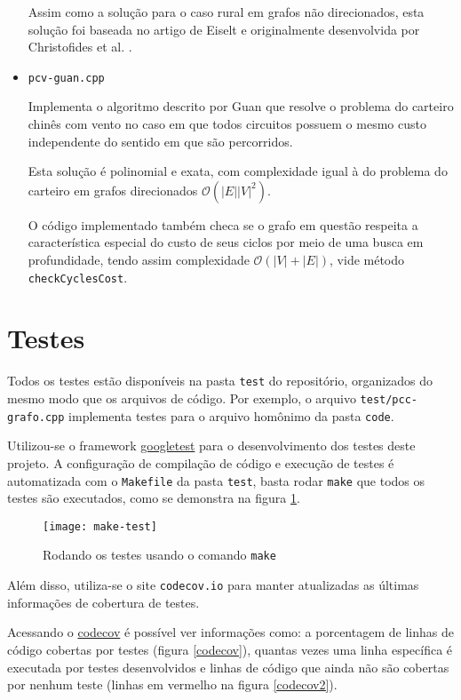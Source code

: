 \begin{itemize}
        Assim como a solução para o caso rural em grafos não direcionados, esta solução foi baseada no artigo de Eiselt \cite{michel} e originalmente desenvolvida por Christofides et al. \cite{christofides-86}.
            
    \item \texttt{pcv-guan.cpp}

        Implementa o algoritmo descrito por Guan \cite{guan-windy} que resolve o problema do carteiro chinês com vento no caso em que todos circuitos possuem o mesmo custo independente do sentido em que são percorridos.
        
        Esta solução é polinomial e exata, com complexidade igual à do problema do carteiro em grafos direcionados $\mathcal{O}(|E||V|^2)$.
        
        O código implementado também checa se o grafo em questão respeita a característica especial do custo de seus ciclos por meio de uma busca em profundidade, tendo assim complexidade $\mathcal{O}(|V| + |E|)$, vide método \texttt{checkCyclesCost}.

\end{itemize}

\section{Testes}

Todos os testes estão disponíveis na pasta \texttt{test} do repositório, organizados do mesmo modo que os arquivos de código.
Por exemplo, o arquivo \texttt{test/pcc-grafo.cpp} implementa testes para o arquivo homônimo da pasta \texttt{code}.


Utilizou-se o framework \href{https://github.com/google/googletest}{googletest} para o desenvolvimento dos testes deste projeto.
A configuração de compilação de código e execução de testes é automatizada com o \texttt{Makefile} da pasta \texttt{test}, basta rodar \texttt{make} que todos os testes são executados, como se demonstra na figura \ref{maketest}.

\begin{figure}[h]
    \centering
    \texttt{[image: make-test]}
    \caption{Rodando os testes usando o comando \texttt{make}}
    \label{maketest}
\end{figure}

Além disso, utiliza-se o site \texttt{codecov.io} para manter atualizadas as últimas informações de cobertura de testes.

Acessando o \href{https://codecov.io/gh/gafeol/chinese-postman}{codecov} é possível ver informações como: a porcentagem de linhas de código cobertas por testes (figura \ref{codecov}), quantas vezes uma linha específica é executada por testes desenvolvidos e linhas de código que ainda não são cobertas por nenhum teste (linhas em vermelho na figura \ref{codecov2}).

